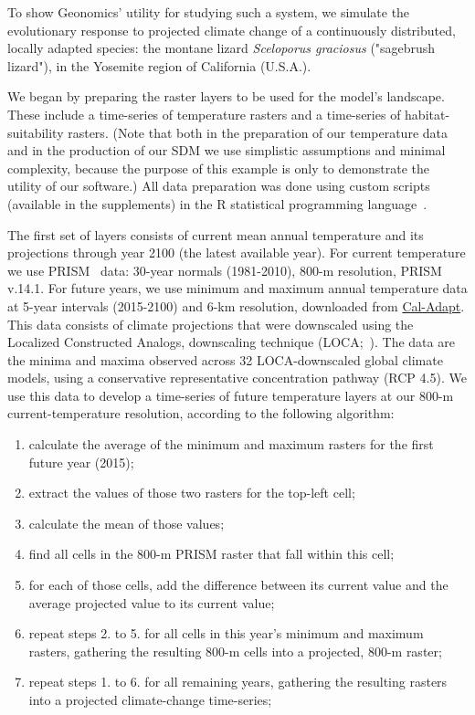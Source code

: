 ﻿\documentclass{article}
\begin{document}
To show Geonomics' utility for studying such a system,
we simulate the evolutionary response to projected climate change
of a continuously distributed, locally adapted species:
the montane lizard \emph{Sceloporus graciosus} ("sagebrush lizard"),
in the Yosemite region of California (U.S.A.).

We began by preparing the raster layers to be used for the model's landscape.
These include a time-series of temperature rasters and a time-series of habitat-suitability rasters.
(Note that both in the preparation of our temperature
data and in the production of our SDM we use simplistic assumptions and minimal complexity,
because the purpose of this example is only to demonstrate the utility of our software.)
All data preparation was done using custom scripts (available in the supplements) in
the R statistical programming language~\cite{Rlang}.

The first set of layers consists of current mean annual temperature and its projections
through year 2100 (the latest available year).
For current temperature we use PRISM~\cite{daly} data: 30-year normals (1981-2010),
800-m resolution, PRISM v.14.1.
For future years, we use minimum and maximum annual temperature data at 5-year intervals (2015-2100)
and 6-km resolution, downloaded from \href{https://cal-adapt.org/help/faq/}{Cal-Adapt}.
This data consists of climate projections that were downscaled using the Localized Constructed Analogs, downscaling technique (LOCA;~\cite{pierce}).
The data are the minima and maxima observed across 32 LOCA-downscaled global climate models,
using a conservative representative concentration pathway (RCP 4.5).
We use this data to develop a time-series of future temperature layers at our 800-m current-temperature resolution,
according to the following algorithm:
\begin{enumerate}
        \item calculate the average of the minimum and maximum rasters for the first future year (2015);
        \item extract the values of those two rasters for the top-left cell;
        \item calculate the mean of those values;
        \item find all cells in the 800-m PRISM raster that fall within this cell;
        \item for each of those cells, add the difference between its current value and the average projected value to its current value;
        \item repeat steps 2. to 5. for all cells in this year's minimum and maximum rasters, gathering the resulting 800-m cells into a projected, 800-m raster;
        \item repeat steps 1. to 6. for all remaining years, gathering the resulting rasters into a projected climate-change time-series;
\end{enumerate}
\end{document}
